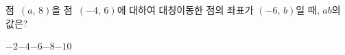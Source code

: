 점~$(a,\,8)$을 점~$(-4,\,6)$에 대하여 대칭이동한 점의 좌표가 $(-6,\,b)$일 때, $ab$의 값은?
\begin{choices32}{$-2$}{$-4$}{$-6$}{$-8$}{$-10$}\end{choices32}
